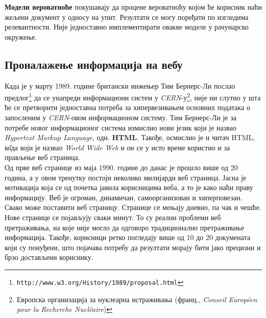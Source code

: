 \documentclass[11pt, serbianc, english, titlepage]{article}
\begin{document}
\textbf{Модели вероватноће} покушавају да процене вероватноћу којом ће корисник наћи жељени документ у односу на упит. Резултати се могу поређати по изгледима релевантности. Није једноставно имплементирати овакве моделе у рачунарско окружење. \\
\subsection{Проналажење информација на вебу}
Када је у марту 1989. године британски инжењер Тим Бернерс-Ли послао предлог\footnote{\texttt{http://www.w3.org/History/1989/proposal.html}}  да се унапреди информациони систем у \emph{CERN}-у\footnote{Европска организација за нуклеарна истраживања (франц., \emph{Conseil Européen pour la Recherche Nucléaire})}, није ни слутио у шта ће се претворити једноставна потреба за хипервезивањем основних података о запосленим у \emph{CERN}-овом информационом систему\cite{berners2004weaving}. Тим Бернерс-Ли је за потребе новог информационог система измислио нови језик који је назвао \emph{Hypertext Markup Language}, одн. \textbf{HTML}. Такође, осмислио је и читач HTML, к\^{о}да који је назвао \emph{World Wide Web} и он се у исто време користио и за прављење веб страница. \\
Од прве веб странице из маја 1990. године до данас је прошло више од 20 година, а у овом тренутку постоји неколико милијарди веб страница. Јасна је мотивација која се од почетка јавила корисницима веба, а то је како наћи праву информацију. Веб је огроман, динамичан, самоорганизован и хиперповезан.\cite[Ch 1.3.1]{langville2011google} Свако може поставити веб страницу. Странице се мењају дневно, па чак и чешће. Нове странице се појављују сваки минут. То су реални проблеми веб претраживања, на које није могло да одговоро традиционално претраживање информација. Такође, корисници ретко погледају више од 10 до 20 докумената који су понуђени, што појачава потребу да резултати морају бити јако прецизни и брзо достављени кориснику.\\
\end{document}
